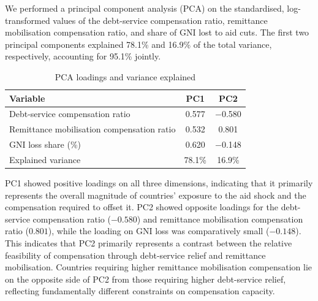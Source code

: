 \documentclass[fleqn,10pt,twocolumn]{wlscirep}
\begin{document}
We performed a principal component analysis (PCA) on the standardised, log-transformed values of the debt-service compensation ratio, remittance mobilisation compensation ratio, and share of GNI lost to aid cuts. The first two principal components explained 78.1\% and 16.9\% of the total variance, respectively, accounting for 95.1\% jointly.

\begin{table}[h]
	\centering
	\small
	\caption{PCA loadings and variance explained}
	\begin{tabular}{lcc}
		\hline
		Variable & PC1 & PC2 \\
		\hline
		Debt-service compensation ratio & 0.577 & $-$0.580 \\
		Remittance mobilisation compensation ratio & 0.532 & 0.801 \\
		GNI loss share (\%) & 0.620 & $-$0.148 \\
		\hline
		Explained variance & 78.1\% & 16.9\% \\
		\hline
	\end{tabular}
\end{table}

PC1 showed positive loadings on all three dimensions, indicating that it primarily represents the overall magnitude of countries' exposure to the aid shock and the compensation required to offset it. PC2 showed opposite loadings for the debt-service compensation ratio ($-0.580$) and remittance mobilisation compensation ratio ($0.801$), while the loading on GNI loss was comparatively small ($-0.148$). This indicates that PC2 primarily represents a contrast between the relative feasibility of compensation through debt-service relief and remittance mobilisation. Countries requiring higher remittance mobilisation compensation lie on the opposite side of PC2 from those requiring higher debt-service relief, reflecting fundamentally different constraints on compensation capacity.
\end{document}
